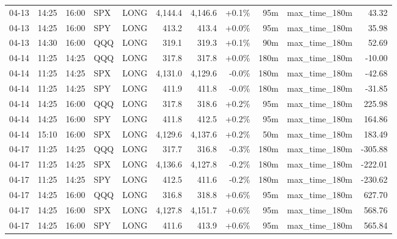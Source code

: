 \documentclass[11pt,a4paper,twoside]{article}
\begin{document}
\begin{center}
\begin{longtable}{>{\color{txtmain}}l l l l l r r r r >{\color{txtmain}}l r}
04-13 & 14:25 & 16:00 & SPX & LONG & 4,144.4 & 4,146.6 & \textcolor{wingreen}{+0.1\%} & 95m & max\_time\_180m & \textcolor{wingreen}{43.32} \\
04-13 & 14:25 & 16:00 & SPY & LONG & 413.2 & 413.4 & \textcolor{wingreen}{+0.0\%} & 95m & max\_time\_180m & \textcolor{wingreen}{35.98} \\
04-13 & 14:30 & 16:00 & QQQ & LONG & 319.1 & 319.3 & \textcolor{wingreen}{+0.1\%} & 90m & max\_time\_180m & \textcolor{wingreen}{52.69} \\
04-14 & 11:25 & 14:25 & QQQ & LONG & 317.8 & 317.8 & \textcolor{wingreen}{+0.0\%} & 180m & max\_time\_180m & \textcolor{lossred}{-10.00} \\
04-14 & 11:25 & 14:25 & SPX & LONG & 4,131.0 & 4,129.6 & \textcolor{lossred}{-0.0\%} & 180m & max\_time\_180m & \textcolor{lossred}{-42.68} \\
04-14 & 11:25 & 14:25 & SPY & LONG & 411.9 & 411.8 & \textcolor{lossred}{-0.0\%} & 180m & max\_time\_180m & \textcolor{lossred}{-31.85} \\
04-14 & 14:25 & 16:00 & QQQ & LONG & 317.8 & 318.6 & \textcolor{wingreen}{+0.2\%} & 95m & max\_time\_180m & \textcolor{wingreen}{225.98} \\
04-14 & 14:25 & 16:00 & SPY & LONG & 411.8 & 412.5 & \textcolor{wingreen}{+0.2\%} & 95m & max\_time\_180m & \textcolor{wingreen}{164.86} \\
04-14 & 15:10 & 16:00 & SPX & LONG & 4,129.6 & 4,137.6 & \textcolor{wingreen}{+0.2\%} & 50m & max\_time\_180m & \textcolor{wingreen}{183.49} \\
04-17 & 11:25 & 14:25 & QQQ & LONG & 317.7 & 316.8 & \textcolor{lossred}{-0.3\%} & 180m & max\_time\_180m & \textcolor{lossred}{-305.88} \\
04-17 & 11:25 & 14:25 & SPX & LONG & 4,136.6 & 4,127.8 & \textcolor{lossred}{-0.2\%} & 180m & max\_time\_180m & \textcolor{lossred}{-222.01} \\
04-17 & 11:25 & 14:25 & SPY & LONG & 412.5 & 411.6 & \textcolor{lossred}{-0.2\%} & 180m & max\_time\_180m & \textcolor{lossred}{-230.62} \\
04-17 & 14:25 & 16:00 & QQQ & LONG & 316.8 & 318.8 & \textcolor{wingreen}{+0.6\%} & 95m & max\_time\_180m & \textcolor{wingreen}{627.70} \\
04-17 & 14:25 & 16:00 & SPX & LONG & 4,127.8 & 4,151.7 & \textcolor{wingreen}{+0.6\%} & 95m & max\_time\_180m & \textcolor{wingreen}{568.76} \\
04-17 & 14:25 & 16:00 & SPY & LONG & 411.6 & 413.9 & \textcolor{wingreen}{+0.6\%} & 95m & max\_time\_180m & \textcolor{wingreen}{565.84} \\

\end{longtable}
\end{center}
\end{document}
